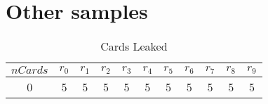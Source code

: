\documentclass{article}
\begin{document}






\newpage
\section{Other samples}

\begin{table}[ht] 
\begin{tabular}{ | c || c | c | c | c | c | c | c | c | c | c  | } 
 \hline 
$nCards$  & $r_{0}$ & $r_{1}$ & $r_{2}$ & $r_{3}$ & $r_{4}$ & $r_{5}$ & $r_{6}$ & $r_{7}$ & $r_{8}$ & $r_{9}$ \\ 
 \hline 
0 & 5 & 5 & 5 & 5 & 5 & 5 & 5 & 5 & 5 & 5 \\ 
\hline
\end{tabular}
\caption{Cards Leaked}
\label{cLeaked-0}
\end{table}
\end{document}
